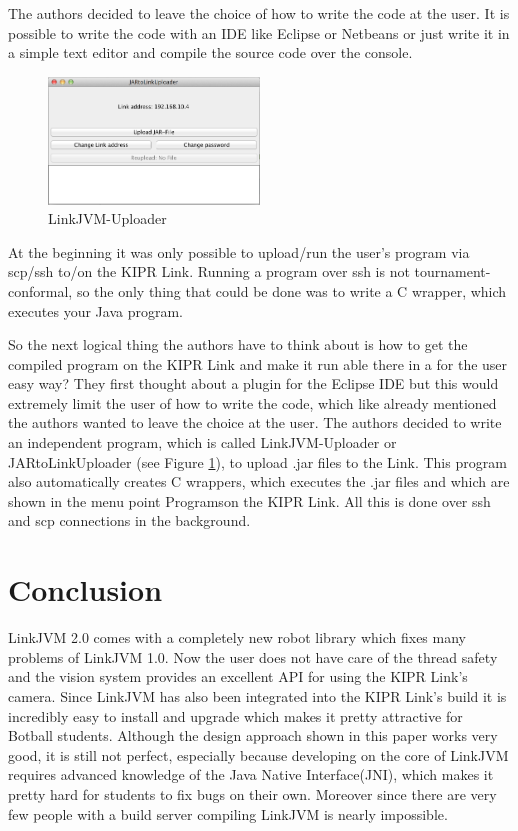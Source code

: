 \documentclass{juniorjournal}
\begin{document}
The authors decided to leave the choice of how to write the code at the user. It
is possible to write the code with an IDE like Eclipse or Netbeans or just write
it in a simple text editor and compile the source code over the console.

\begin{figure}[H]
\centering
\includegraphics[width=0.5\textwidth]{images/linkjvm_uploader.jpg}
\caption{LinkJVM-Uploader}
\label{fig:linkjvm_uploader}
\end{figure}

At the beginning it was only possible to upload/run the user's program via scp/ssh to/on the KIPR\cite{KIPR} Link\cite{link}.
Running a program over ssh is not tournament-conformal, so the only thing that could be done
was to write a C wrapper, which executes your Java\cite{Java} program.

So the next logical thing the authors have to think about is how to get the compiled
program on the KIPR\cite{KIPR} Link\cite{link} and make it run able there in a for the user easy way?
They first thought about a plugin for the Eclipse IDE but this would extremely
limit the user of how to write the code, which like already mentioned the
authors wanted to leave the choice at the user.
The authors decided to write an independent program, which is called
LinkJVM-Uploader or JARtoLinkUploader (see Figure \ref{fig:linkjvm_uploader}),
to upload .jar files to the Link\cite{link}. This program also automatically creates C
wrappers, which executes the .jar files and which are shown in the menu point
\frqq Programs\flqq  on the KIPR\cite{KIPR} Link\cite{link}. All this is done over ssh and scp connections in
the background.

\section{Conclusion}
LinkJVM 2.0 comes with a completely new robot library which fixes many problems of LinkJVM 1.0\cite{linkjvm1.0}.
Now the user does not have care of the thread safety and the vision system provides an excellent API for using the KIPR\cite{KIPR} Link's\cite{link} camera.
Since LinkJVM has also been integrated into the KIPR\cite{KIPR} Link's\cite{link} build it is incredibly easy to install and upgrade which makes it pretty attractive for Botball students.
Although the design approach shown in this paper works very good, it is still not perfect,
especially because developing on the core of LinkJVM requires advanced knowledge
of the Java\cite{Java} Native Interface(JNI), which makes it pretty hard for students to fix bugs on their own.
Moreover since there are very few people with a build server compiling LinkJVM is nearly impossible.
\end{document}
